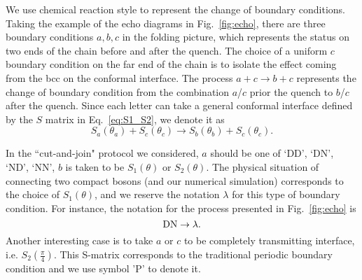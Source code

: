 
We use chemical reaction style to represent the change of boundary conditions. Taking the example of the echo diagrams in Fig.~\ref{fig:echo}, there are three boundary conditions $a,b,c$ in the folding picture, which represents the status on two ends of the chain before and after the quench. The choice of a uniform $c$ boundary condition on the far end of the chain is to isolate the effect coming from the bcc on the conformal interface. The process $a + c \rightarrow b + c$ represents the change of boundary condition from the combination $a$/$c$ prior the quench to $b$/$c$ after the quench. Since each letter can take a general conformal interface defined by the $S$ matrix in Eq.~\eqref{eq:S1_S2}, we denote it as
\begin{equation}
S_a( \theta_a ) + S_c( \theta_c) \rightarrow S_b( \theta_b )  + S_c( \theta_c ) .
\end{equation}

In the ``cut-and-join" protocol we considered, $a$ should be one of `DD', `DN', `ND', `NN', $b$ is taken to be $S_1( \theta )$ or $S_2( \theta )$. The physical situation of connecting two compact bosons (and our numerical simulation) corresponds to the choice of $S_1( \theta)$, and we reserve the notation $\lambda$ for this type of boundary condition. For instance, the notation for the process presented in Fig.~\ref{fig:echo} is
\begin{equation}
\label{eq:DNDN}
 {\rm DN} \rightarrow \lambda.
\end{equation}
Another interesting case is to take $a$ or $c$ to be completely transmitting interface, i.e. $S_2( \frac{\pi}{4} )$. This S-matrix corresponds to the traditional periodic boundary condition and we use symbol 'P' to denote it. 


